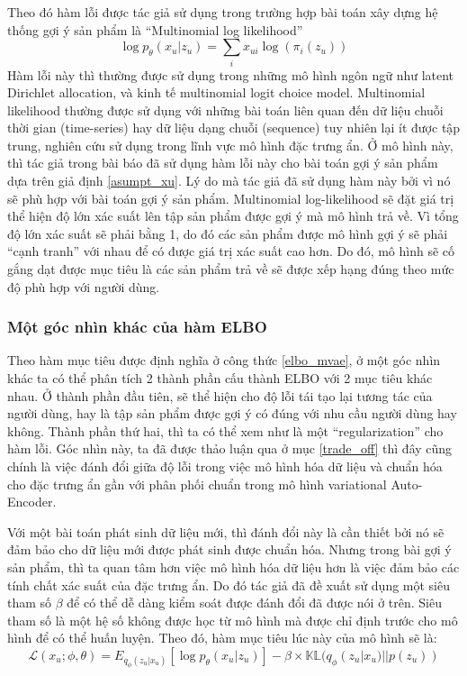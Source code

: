     Theo đó hàm lỗi được tác giả sử dụng trong trường hợp bài toán xây dựng hệ thống gợi ý sản phẩm là ``Multinomial log likelihood'' 
    \begin{equation}
        \log p_\theta(x_u|z_u) = \sum_i x_{ui}\log (\pi_i(z_u))
    \end{equation}
    Hàm lỗi này thì thường được sử dụng trong những mô hình ngôn ngữ như latent Dirichlet allocation, và kinh tế multinomial logit choice model. 
    Multinomial likelihood thường được sử dụng với những bài toán liên quan đến dữ liệu chuỗi thời gian (time-series) hay dữ liệu dạng chuỗi (sequence) tuy nhiên lại ít được tập trung, nghiên cứu sử dụng trong lĩnh vực mô hình đặc trưng ẩn. 
    Ở mô hình này, thì tác giả trong bài báo \cite{mvae} đã sử dụng hàm lỗi này cho bài toán gợi ý sản phẩm dựa trên giả định \ref{asumpt_xu}.
    Lý do mà tác giả đã sử dụng hàm này bởi vì nó sẽ phù hợp với bài toán gợi ý sản phẩm.
    Multinomial log-likelihood sẽ đặt giá trị thể hiện độ lớn xác suất lên tập sản phẩm được gợi ý mà mô hình trả về. 
    Vì tổng độ lớn xác suất sẽ phải bằng 1, do đó các sản phẩm được mô hình gợi ý sẽ phải ``cạnh tranh'' với nhau để có được giá trị xác suất cao hơn. 
    Do đó, mô hình sẽ cố gắng dạt được mục tiêu là các sản phẩm trả về sẽ được xếp hạng đúng theo mức độ phù hợp với người dùng. 
    
    \subsubsection{Một góc nhìn khác của hàm ELBO}
    \label{subsubsecELBO}
    Theo hàm mục tiêu được định nghĩa ở công thức \ref{elbo_mvae}, ở một góc nhìn khác ta có thể phân tích 2 thành phần cấu thành ELBO với 2 mục tiêu khác nhau.
    Ở thành phần đầu tiên, sẽ thể hiện cho độ lỗi tái tạo lại tương tác của người dùng, hay là tập sản phẩm được gợi ý có đúng với nhu cầu người dùng hay không. 
    Thành phần thứ hai, thì ta có thể xem như là một ``regularization'' cho hàm lỗi.
    Góc nhìn này, ta đã được thảo luận qua ở mục \ref{trade_off} thì đây cũng chính là việc đánh đổi giữa độ lỗi trong việc mô hình hóa dữ liệu và chuẩn hóa cho đặc trưng ẩn gần với phân phối chuẩn trong mô hình variational Auto-Encoder.

    Với một bài toán phát sinh dữ liệu mới, thì đánh đổi này là cần thiết bởi nó sẽ đảm bảo cho dữ liệu mới được phát sinh được chuẩn hóa.
    Nhưng trong bài gợi ý sản phẩm, thì ta quan tâm hơn việc mô hình hóa dữ liệu hơn là việc đảm bảo các tính chất xác suất của đặc trưng ẩn.
    Do đó tác giả đã đề xuất sử dụng một siêu tham số $\beta$ để có thể dễ dàng kiểm soát được đánh đổi đã được nói ở trên. 
    Siêu tham số là một hệ số không được học từ mô hình mà được chỉ định trước cho mô hình để có thể huấn luyện.
    Theo đó, hàm mục tiêu lúc này của mô hình sẽ là:
    \begin{equation}
        \label{elbo_betamvae}
        \mathcal{L}(x_u;\phi,\theta) = E_{q_\phi(z_u|x_u)}[\log p_\theta(x_u|z_u)] - \beta \times \mathbb{KL}(q_\phi(z_u|x_u) || p(z_u))
    \end{equation}

